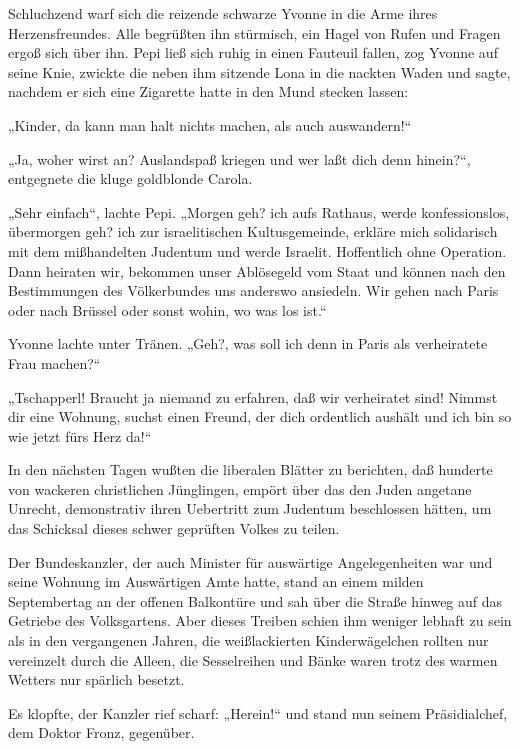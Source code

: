 Schluchzend warf sich die reizende schwarze Yvonne in die Arme
ihres Herzensfreundes. Alle begrüßten ihn stürmisch, ein Hagel von
Rufen und Fragen ergoß sich über ihn. Pepi ließ sich ruhig in einen
Fauteuil fallen, zog Yvonne auf seine Knie, zwickte die neben ihm
sitzende Lona in die nackten Waden und sagte, nachdem er sich eine
Zigarette hatte in den Mund stecken lassen:

„Kinder, da kann man halt nichts machen, als auch auswandern!“

„Ja, woher wirst an? Auslandspaß kriegen und wer
laßt dich denn hinein?“, entgegnete die kluge goldblonde Carola.

„Sehr einfach“, lachte Pepi. „Morgen geh? ich aufs Rathaus, werde
konfessionslos, übermorgen geh? ich zur israelitischen
Kultusgemeinde, erkläre mich solidarisch mit dem mißhandelten
Judentum und werde Israelit. Hoffentlich ohne Operation. Dann
heiraten wir, bekommen unser Ablösegeld vom Staat und können nach
den Bestimmungen des Völkerbundes uns anderswo ansiedeln. Wir gehen
nach Paris oder nach Brüssel oder sonst wohin, wo was los ist.“

Yvonne lachte unter Tränen. „Geh?, was soll ich denn in Paris als
verheiratete Frau machen?“

„Tschapperl! Braucht ja niemand zu erfahren, daß wir verheiratet
sind! Nimmst dir eine Wohnung, suchst einen Freund, der dich
ordentlich aushält und ich bin so wie jetzt fürs Herz da!“

In den nächsten Tagen wußten die liberalen Blätter zu berichten,
daß hunderte von wackeren christlichen Jünglingen, empört über das
den Juden angetane Unrecht, demonstrativ ihren Uebertritt zum
Judentum beschlossen hätten, um das Schicksal dieses schwer
geprüften Volkes zu teilen.

\tb{* * *}
Der Bundeskanzler, der auch Minister für auswärtige
Angelegenheiten war und seine Wohnung im Auswärtigen Amte hatte,
stand an einem milden Septembertag an der offenen Balkontüre und
sah über die Straße hinweg auf das Getriebe des Volksgartens. Aber
dieses Treiben schien ihm weniger lebhaft zu sein als in den
vergangenen Jahren, die weißlackierten Kinderwägelchen rollten nur
vereinzelt durch die Alleen, die Sesselreihen und Bänke waren trotz
des warmen Wetters nur spärlich besetzt.

Es klopfte, der Kanzler rief scharf: „Herein!“ und stand nun seinem
Präsidialchef, dem Doktor Fronz, gegenüber.

